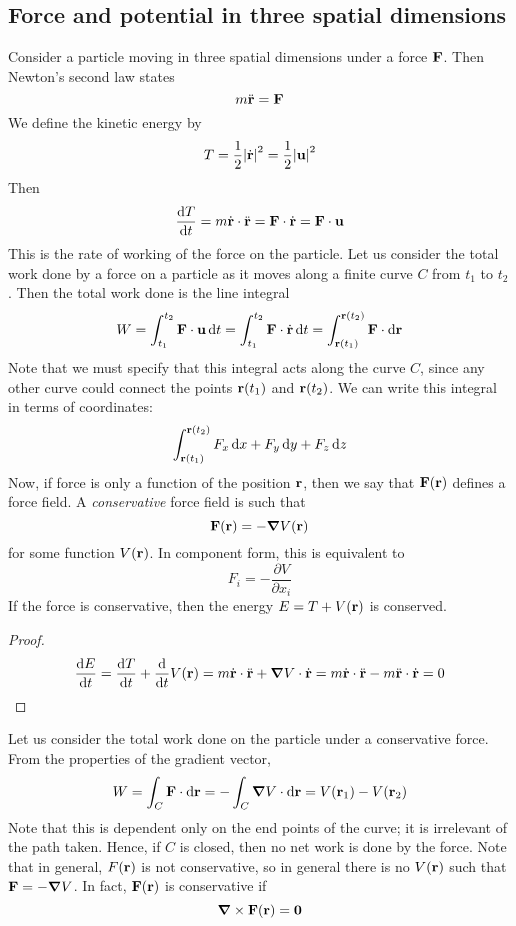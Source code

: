 \subsection{Force and potential in three spatial dimensions}
Consider a particle moving in three spatial dimensions under a force \(\vb F\).
Then Newton's second law states
\[
	m \ddot {\vb r} = \vb F
\]
We define the kinetic energy by
\[
	T = \frac{1}{2}\abs{\dot {\vb r}}^2 = \frac{1}{2}\abs{\vb u}^2
\]
Then
\[
	\frac{\dd{T}}{\dd{t}} = m \dot {\vb r} \cdot \ddot {\vb r} = \vb F \cdot \dot{\vb r} = \vb F \cdot \vb u
\]
This is the rate of working of the force on the particle.
Let us consider the total work done by a force on a particle as it moves along a finite curve \(C\) from \(t_1\) to \(t_2\).
Then the total work done is the line integral
\[
	W = \int_{t_1}^{t_2} \vb F \cdot \vb u \dd{t}
	= \int_{t_1}^{t_2} \vb F \cdot \dot {\vb r} \dd{t}
	= \int_{\vb r(t_1)}^{\vb r(t_2)} \vb F \cdot \dd \vb r
\]
Note that we must specify that this integral acts along the curve \(C\), since any other curve could connect the points \(\vb r(t_1)\) and \(\vb r(t_2)\).
We can write this integral in terms of coordinates:
\[
	\int_{\vb r(t_1)}^{\vb r(t_2)} F_x \dd{x} + F_y \dd{y} + F_z \dd{z}
\]
Now, if force is only a function of the position \(\vb r\), then we say that \(\vb F(\vb r)\) defines a force field.
A \textit{conservative} force field is such that
\[
	\vb F(\vb r) = -\grad V(\vb r)
\]
for some function \(V(\vb r)\).
In component form, this is equivalent to
\[
	F_i = -\frac{\partial V}{\partial x_i}
\]
If the force is conservative, then the energy \(E = T + V(\vb r)\) is conserved.
\begin{proof}
	\[
		\frac{\dd{E}}{\dd{t}} = \frac{\dd{T}}{\dd{t}} + \frac{\dd}{\dd{t}}V(\vb r) = m \dot{\vb r} \cdot \ddot{\vb r} + \grad V \cdot \dot{\vb r} = m\dot{\vb r} \cdot \ddot{\vb r} - m\ddot{\vb r} \cdot \dot{\vb r} = 0
	\]
\end{proof}
Let us consider the total work done on the particle under a conservative force.
From the properties of the gradient vector,
\[
	W = \int_C \vb F \cdot \dd \vb r = -\int_C \grad V \cdot \dd \vb r = V(\vb r_1) - V(\vb r_2)
\]
Note that this is dependent only on the end points of the curve; it is irrelevant of the path taken.
Hence, if \(C\) is closed, then no net work is done by the force.
Note that in general, \(F(\vb r)\) is not conservative, so in general there is no \(V(\vb r)\) such that \(\vb F = -\grad V\).
In fact, \(\vb F(\vb r)\) is conservative if
\[
	\grad \times \vb F(\vb r) = \vb 0
\]
